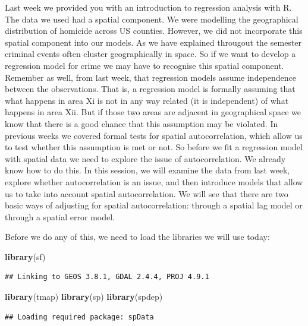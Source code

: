 \documentclass[]{book}
\newenvironment{Shaded}{\begin{snugshade}}{\end{snugshade}}
\newcommand{\KeywordTok}[1]{\textcolor[rgb]{0.13,0.29,0.53}{\textbf{#1}}}
\newcommand{\NormalTok}[1]{#1}
\begin{document}
Last week we provided you with an introduction to regression analysis with R. The data we used had a spatial component. We were modelling the geographical distribution of homicide across US counties. However, we did not incorporate this spatial component into our models. As we have explained througout the semester criminal events often cluster geographically in space. So if we want to develop a regression model for crime we may have to recognise this spatial component. Remember as well, from last week, that regression models assume independence between the observations. That is, a regression model is formally assuming that what happens in area Xi is not in any way related (it is independent) of what happens in area Xii. But if those two areas are adjacent in geographical space we know that there is a good chance that this assumption may be violated. In previous weeks we covered formal tests for spatial autocorrelation, which allow us to test whether this assumption is met or not. So before we fit a regression model with spatial data we need to explore the issue of autocorrelation. We already know how to do this. In this session, we will examine the data from last week, explore whether autocorrelation is an issue, and then introduce models that allow us to take into account spatial autocorrelation. We will see that there are two basic ways of adjusting for spatial autocorrelation: through a spatial lag model or through a spatial error model.

Before we do any of this, we need to load the libraries we will use today:

\begin{Shaded}
\begin{Highlighting}[]
\KeywordTok{library}\NormalTok{(sf)}
\end{Highlighting}
\end{Shaded}

\begin{verbatim}
## Linking to GEOS 3.8.1, GDAL 2.4.4, PROJ 4.9.1
\end{verbatim}

\begin{Shaded}
\begin{Highlighting}[]
\KeywordTok{library}\NormalTok{(tmap)}
\KeywordTok{library}\NormalTok{(sp)}
\KeywordTok{library}\NormalTok{(spdep)}
\end{Highlighting}
\end{Shaded}

\begin{verbatim}
## Loading required package: spData
\end{verbatim}
\end{document}
